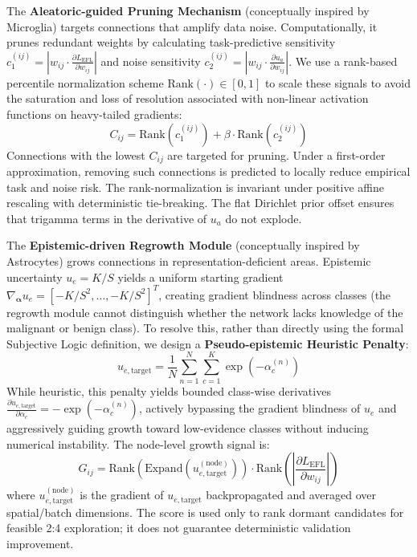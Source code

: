 \documentclass[letterpaper]{article} %
\begin{document}
The \textbf{Aleatoric-guided Pruning Mechanism} (conceptually inspired by Microglia) targets connections that amplify data noise. Computationally, it prunes redundant weights by calculating task-predictive sensitivity $c_1^{(ij)} = | w_{ij} \cdot \frac{\partial L_{\text{EFL}}}{\partial w_{ij}} |$ and noise sensitivity $c_2^{(ij)} = | w_{ij} \cdot \frac{\partial u_a}{\partial w_{ij}} |$. We use a rank-based percentile normalization scheme $\text{Rank}(\cdot) \in [0, 1]$ to scale these signals to avoid the saturation and loss of resolution associated with non-linear activation functions on heavy-tailed gradients:
\begin{equation}\label{eq:C_ij}
    C_{ij} = \text{Rank}(c_1^{(ij)}) + \beta \cdot \text{Rank}(c_2^{(ij)})
\end{equation}
Connections with the lowest $C_{ij}$ are targeted for pruning. Under a first-order approximation, removing such connections is predicted to locally reduce empirical task and noise risk. The rank-normalization is invariant under positive affine rescaling with deterministic tie-breaking. The flat Dirichlet prior offset ensures that trigamma terms in the derivative of $u_a$ do not explode.

The \textbf{Epistemic-driven Regrowth Module} (conceptually inspired by Astrocytes) grows connections in representation-deficient areas. Epistemic uncertainty $u_e = K/S$ yields a uniform starting gradient $\nabla_{\bm{\alpha}} u_e = [-K/S^2, \ldots, -K/S^2]^T$, creating gradient blindness across classes (the regrowth module cannot distinguish whether the network lacks knowledge of the malignant or benign class). To resolve this, rather than directly using the formal Subjective Logic definition, we design a \textbf{Pseudo-epistemic Heuristic Penalty}:
\begin{equation}\label{eq:u_e_target}
    u_{e,\text{target}} = \frac{1}{N} \sum_{n=1}^N \sum_{c=1}^K \exp(-\alpha_c^{(n)})
\end{equation}
While heuristic, this penalty yields bounded class-wise derivatives $\frac{\partial u_{e,\text{target}}}{\partial \alpha_c} = -\exp(-\alpha_c^{(n)})$, actively bypassing the gradient blindness of $u_e$ and aggressively guiding growth toward low-evidence classes without inducing numerical instability. The node-level growth signal is:
\begin{equation}\label{eq:G_ij}
    G_{ij} = \text{Rank}(\text{Expand}(u_{e,\text{target}}^{(\text{node})})) \cdot \text{Rank}\!\left(\left|\frac{\partial L_{\text{EFL}}}{\partial w_{ij}}\right|\right)
\end{equation}
where $u_{e,\text{target}}^{(\text{node})}$ is the gradient of $u_{e,\text{target}}$ backpropagated and averaged over spatial/batch dimensions. The score is used only to rank dormant candidates for feasible 2:4 exploration; it does not guarantee deterministic validation improvement.
\end{document}
